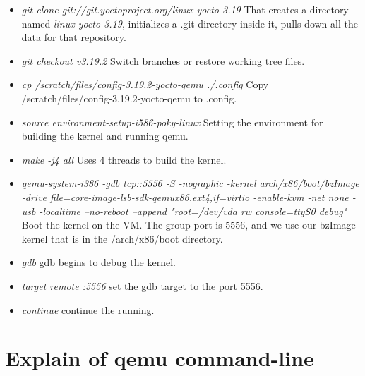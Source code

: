 \documentclass[10pt,draftclsnofoot,peerreview,letterpaper,onecolumn,]{IEEEtran}
\begin{document}
\begin{itemize}
\item \emph{git clone git://git.yoctoproject.org/linux-yocto-3.19} That creates a directory named \emph{linux-yocto-3.19}, initializes a .git directory inside it, pulls down all the data for that repository.
\item \emph{git checkout v3.19.2} Switch branches or restore working tree files.
\item \emph{cp /scratch/files/config-3.19.2-yocto-qemu ./.config} Copy /scratch/files/config-3.19.2-yocto-qemu to .config.
\item \emph{source environment-setup-i586-poky-linux} Setting the environment for building the kernel and running qemu.
\item \emph{make -j4 all} Uses 4 threads to build the kernel.
\item \emph{qemu-system-i386 -gdb tcp::5556 -S -nographic -kernel arch/x86/boot/bzImage -drive file=core-image-lsb-sdk-qemux86.ext4,if=virtio -enable-kvm -net none -usb -localtime --no-reboot --append "root=/dev/vda rw console=ttyS0 debug"} Boot the kernel on the VM. The group port is 5556, and we use our bzImage kernel that is in the /arch/x86/boot directory.
\item \emph{gdb} gdb begins to debug the kernel.
\item \emph{target remote :5556} set the gdb target to the port 5556.
\item \emph{continue} continue the running.
\end{itemize}

\section{Explain of qemu command-line}
\end{document}
